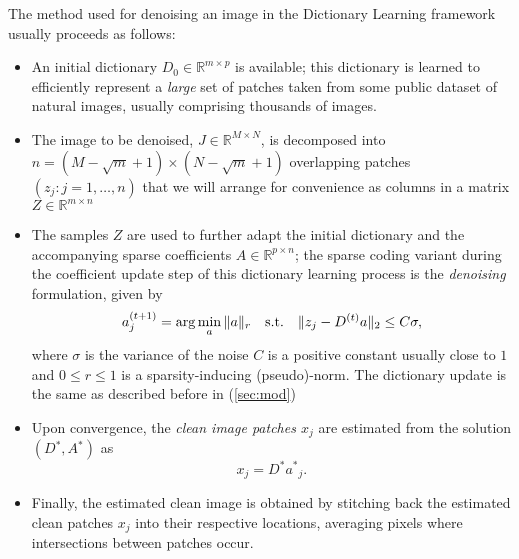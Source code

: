 \documentclass[twocolumn]{IEEEtran}
\theoremstyle{definition}
\newcommand{\refeq}[1]{(\ref{#1})}
\def\opt{\ensuremath{^{*}}}
\def\reals{\ensuremath{\mathbb{R}}}
\begin{document}
The method used for denoising an image in the Dictionary Learning framework usually proceeds as follows:
\begin{itemize}
\item An initial dictionary $D_0 \in \reals^{m{\times}p}$ is available; this dictionary is learned to efficiently represent a \emph{large} set of patches taken from some public dataset of natural images, usually comprising thousands of images.
\item The image to be denoised, $J \in \reals^{M{\times}N}$, is decomposed into $n=(M-\sqrt{m}+1){\times}(N-\sqrt{m}+1)$ overlapping patches $(z_j : j = 1,\ldots,n)$ that we will arrange for convenience as columns in a matrix $Z \in \reals^{m{\times}n}$
\item The samples $Z$ are used to further adapt the initial dictionary and the accompanying sparse coefficients $A \in \reals^{p{\times}n}$; the sparse coding variant during the coefficient update step of this dictionary learning process is the \emph{denoising} formulation, given by
\[
a^{(t+1)}_j = \arg\min_a \|a\|_r \quad\mathrm{s.t.}\quad \|z_j - D^{(t)}a \|_2 \leq C\sigma, 
\]
where $\sigma$ is the variance of the noise $C$ is a positive constant usually close to $1$ and $0 \leq r \leq 1$ is a sparsity-inducing (pseudo)-norm. The dictionary update is the same as described before in \refeq{sec:mod}
\item Upon convergence, the \emph{clean image patches $x_j$} are estimated from the solution $(D\opt,A\opt)$ as $$x_j = D\opt a\opt_j.$$
\item Finally, the estimated clean image is obtained by stitching back the estimated clean patches $x_j$ into their respective locations, averaging pixels where intersections between patches occur.
\end{itemize}
\end{document}
